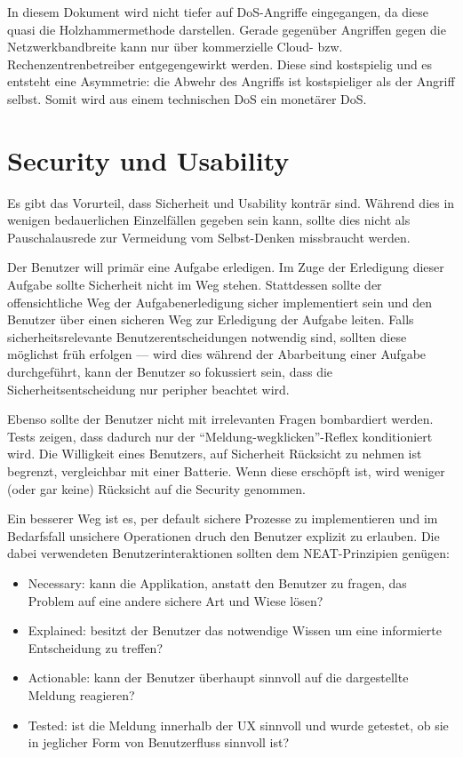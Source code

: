 In diesem Dokument wird nicht tiefer auf DoS-Angriffe eingegangen, da diese quasi die Holzhammermethode darstellen. Gerade gegenüber Angriffen gegen die Netzwerkbandbreite kann nur über kommerzielle Cloud- bzw. Rechenzentrenbetreiber entgegengewirkt werden. Diese sind kostspielig und es entsteht eine Asymmetrie: die Abwehr des Angriffs ist kostspieliger als der Angriff selbst. Somit wird aus einem technischen DoS ein monetärer DoS.

\section{Security und Usability}

Es gibt das Vorurteil, dass Sicherheit und Usability konträr sind. Während dies in wenigen bedauerlichen Einzelfällen gegeben sein kann, sollte dies nicht als Pauschalausrede zur Vermeidung vom Selbst-Denken missbraucht werden.

Der Benutzer will primär eine Aufgabe erledigen. Im Zuge der Erledigung dieser Aufgabe sollte Sicherheit nicht im Weg stehen. Stattdessen sollte der offensichtliche Weg der Aufgabenerledigung sicher implementiert sein und den Benutzer über einen sicheren Weg zur Erledigung der Aufgabe leiten. Falls sicherheitsrelevante Benutzerentscheidungen notwendig sind, sollten diese möglichst früh erfolgen --- wird dies während der Abarbeitung einer Aufgabe durchgeführt, kann der Benutzer so fokussiert sein, dass die Sicherheitsentscheidung nur peripher beachtet wird.

Ebenso sollte der Benutzer nicht mit irrelevanten Fragen bombardiert werden. Tests zeigen, dass dadurch nur der ``Meldung-wegklicken''-Reflex konditioniert wird. Die Willigkeit eines Benutzers, auf Sicherheit Rücksicht zu nehmen ist begrenzt, vergleichbar mit einer Batterie. Wenn diese erschöpft ist, wird weniger (oder gar keine) Rücksicht auf die Security genommen.

Ein besserer Weg ist es, per default sichere Prozesse zu implementieren und im Bedarfsfall unsichere Operationen druch den Benutzer explizit zu erlauben. Die dabei verwendeten Benutzerinteraktionen sollten dem NEAT-Prinzipien genügen:

\begin{itemize}
	\item Necessary: kann die Applikation, anstatt den Benutzer zu fragen, das Problem auf eine andere sichere Art und Wiese lösen?
	\item Explained: besitzt der Benutzer das notwendige Wissen um eine informierte Entscheidung zu treffen?
	\item Actionable: kann der Benutzer überhaupt sinnvoll auf die dargestellte Meldung reagieren?
	\item Tested: ist die Meldung innerhalb der UX sinnvoll und wurde getestet, ob sie in jeglicher Form von Benutzerfluss sinnvoll ist?
\end{itemize}


